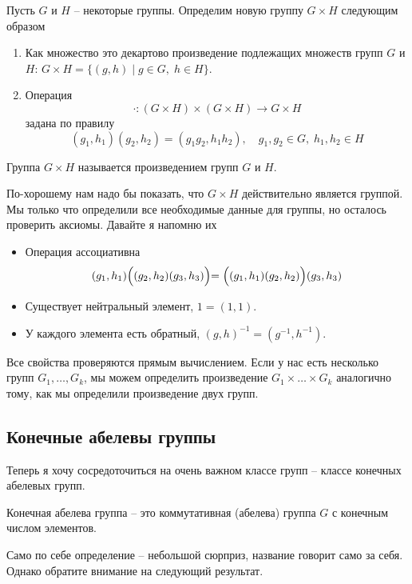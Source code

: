 \begin{definition}
Пусть $G$ и $H$ -- некоторые группы.
Определим новую группу $G\times H$ следующим образом
\begin{enumerate}
\item Как множество это декартово произведение подлежащих множеств групп $G$ и $H$: $G\times H = \{(g, h)\mid g\in G,\;h\in H\}$.

\item Операция
\[
\cdot \colon (G\times H)\times (G\times H) \to G\times H
\]
задана по правилу
\[
(g_1, h_1) (g_2, h_2) = (g_1 g_2, h_1 h_2),\quad g_1, g_2 \in G, \;h_1, h_2\in H
\]
\end{enumerate}
Группа $G\times H$ называется произведением групп $G$ и $H$.
\end{definition}

По-хорошему нам надо бы показать, что $G\times H$ действительно является группой.
Мы только что определили все необходимые данные для группы, но осталось проверить аксиомы.
Давайте я напомню их
\begin{itemize}
\item Операция ассоциативна
\[
(g_1, h_1)\Bigl( (g_2, h_2) (g_3, h_3) \Bigl) = \Bigl((g_1, h_1) (g_2, h_2)\Bigl) (g_3, h_3)
\]

\item Существует нейтральный элемент, $1 = (1, 1)$.

\item У каждого элемента есть обратный,  $(g, h)^{-1} = (g^{-1}, h^{-1})$.
\end{itemize}
Все свойства проверяются прямым вычислением.
Если у нас есть несколько групп $G_1,\ldots,G_k$, мы можем определить произведение $G_1\times \ldots \times G_k$ аналогично тому, как мы определили произведение двух групп.

\subsection{Конечные абелевы группы}

Теперь я хочу сосредоточиться на очень важном классе групп -- классе конечных абелевых групп.

\begin{definition}
Конечная абелева группа -- это коммутативная (абелева) группа $G$ с конечным числом элементов.
\end{definition}

Само по себе определение -- небольшой сюрприз, название говорит само за себя.
Однако обратите внимание на следующий результат.


